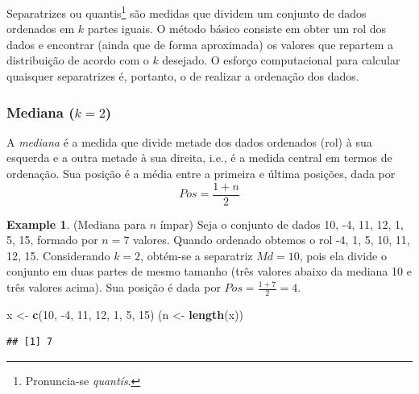 \documentclass[
]{book}
\newenvironment{Shaded}{\begin{snugshade}}{\end{snugshade}}
\newcommand{\DecValTok}[1]{\textcolor[rgb]{0.00,0.00,0.81}{#1}}
\newcommand{\KeywordTok}[1]{\textcolor[rgb]{0.13,0.29,0.53}{\textbf{#1}}}
\newcommand{\NormalTok}[1]{#1}
\newcommand{\StringTok}[1]{\textcolor[rgb]{0.31,0.60,0.02}{#1}}
\theoremstyle{definition}
\theoremstyle{definition}
\newtheorem{example}{Example}[chapter]
\theoremstyle{definition}
\theoremstyle{remark}
\begin{document}
Separatrizes ou quantis\footnote{Pronuncia-se \emph{quantís}.} são medidas que dividem um conjunto de dados ordenados em \(k\) partes iguais. O método básico consiste em obter um rol dos dados e encontrar (ainda que de forma aproximada) os valores que repartem a distribuição de acordo com o \(k\) desejado. O esforço computacional para calcular quaisquer separatrizes é, portanto, o de realizar a ordenação dos dados.

\hypertarget{mediana-k2}{%
\subsubsection*{\texorpdfstring{Mediana (\(k=2\))}{Mediana (k=2)}}\label{mediana-k2}}

A \emph{mediana} é a medida que divide metade dos dados ordenados (rol) à sua esquerda e a outra metade à sua direita, i.e., é a medida central em termos de ordenação. Sua posição é a média entre a primeira e última posições, dada por
\begin{equation}
Pos = \frac{1+n}{2}
\label{eq:pos-mediana}
\end{equation}

\begin{example}
\protect\hypertarget{exm:mediana-n-impar}{}{\label{exm:mediana-n-impar} }(Mediana para \(n\) ímpar) Seja o conjunto de dados 10, -4, 11, 12, 1, 5, 15, formado por \(n=7\) valores. Quando ordenado obtemos o rol -4, 1, 5, 10, 11, 12, 15. Considerando \(k=2\), obtém-se a separatriz \(Md=10\), pois ela divide o conjunto em duas partes de mesmo tamanho (três valores abaixo da mediana 10 e três valores acima). Sua posição é dada por \(Pos=\frac{1+7}{2}=4\).
\end{example}

\begin{Shaded}
\begin{Highlighting}[]
\NormalTok{x \textless{}{-}}\StringTok{ }\KeywordTok{c}\NormalTok{(}\DecValTok{10}\NormalTok{, }\DecValTok{{-}4}\NormalTok{, }\DecValTok{11}\NormalTok{, }\DecValTok{12}\NormalTok{, }\DecValTok{1}\NormalTok{, }\DecValTok{5}\NormalTok{, }\DecValTok{15}\NormalTok{)}
\NormalTok{(n \textless{}{-}}\StringTok{ }\KeywordTok{length}\NormalTok{(x))}
\end{Highlighting}
\end{Shaded}

\begin{verbatim}
## [1] 7
\end{verbatim}
\end{document}
